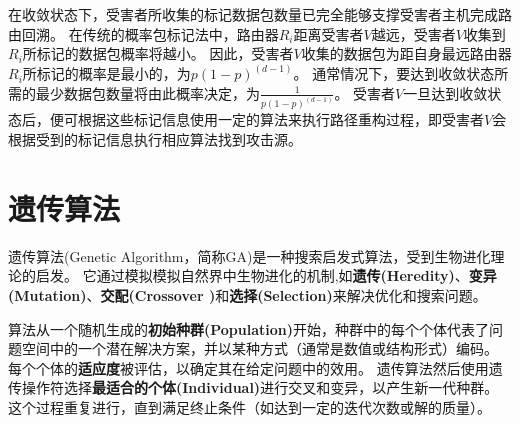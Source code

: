 在收敛状态下，受害者所收集的标记数据包数量已完全能够支撑受害者主机完成路由回溯。
在传统的概率包标记法中，路由器$R_i$距离受害者$V$越远，受害者$V$收集到$R_i$所标记的数据包概率将越小。
因此，受害者$V$收集的数据包为距自身最远路由器$R_i$所标记的概率是最小的，为$p(1-p)^(d-1)$。
通常情况下，要达到收敛状态所需的最少数据包数量将由此概率决定，为$\frac{1}{p(1-p)^(d-1)}$。
受害者$V$一旦达到收敛状态后，便可根据这些标记信息使用一定的算法来执行路径重构过程，即受害者$V$会根据受到的标记信息执行相应算法找到攻击源。

\section{遗传算法}
遗传算法(Genetic Algorithm，简称GA)是一种搜索启发式算法，受到生物进化理论的启发。
它通过模拟模拟自然界中生物进化的机制,如\textbf{遗传(Heredity)}、\textbf{变异(Mutation)}、\textbf{交配(Crossover )}和\textbf{选择(Selection)}来解决优化和搜索问题。


算法从一个随机生成的\textbf{初始种群(Population)}开始，种群中的每个个体代表了问题空间中的一个潜在解决方案，并以某种方式（通常是数值或结构形式）编码。
每个个体的\textbf{适应度}被评估，以确定其在给定问题中的效用。
遗传算法然后使用遗传操作符选择\textbf{最适合的个体(Individual)}进行交叉和变异，以产生新一代种群。
这个过程重复进行，直到满足终止条件（如达到一定的迭代次数或解的质量）。


